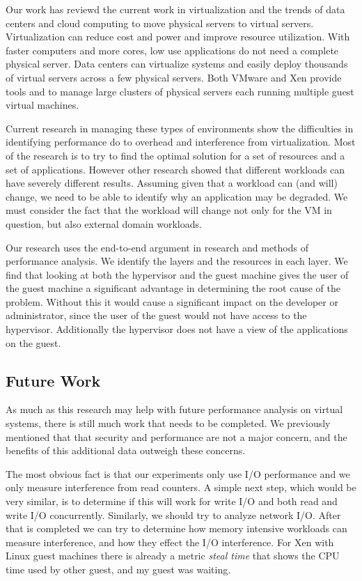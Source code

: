 
Our work has reviewd the current work in virtualization and the trends of data centers and cloud computing to move physical servers to virtual servers.  Virtualization can reduce cost and power and improve resource utilization.  With faster computers and more cores, low use applications do not need a complete physical server.  Data centers can virtualize systems and easily deploy thousands of virtual servers across a few physical servers.  Both VMware and Xen provide tools and to manage large clusters of physical servers each running multiple guest virtual machines.

Current research in managing these types of environments show the difficulties in identifying performance do to overhead and interference from virtualization.  Most of the research is to try to find the optimal solution for a set of resources and a set of applications.  However other research showed that different workloads can have severely different results.  Assuming given that a workload can (and will) change, we need to be able to identify why an application may be degraded.  We must consider the fact that the workload will change not only for the VM in question, but also external domain workloads. 

Our research uses the end-to-end argument in research and methods of performance analysis.  We identify the layers and the resources in each layer.  We find that looking at both the hypervisor and the guest machine gives the user of the guest machine a significant advantage in determining the root cause of the problem.  Without this it would cause a significant impact on the developer or administrator, since the user of the guest would not have access to the hypervisor.  Additionally the hypervisor does not have a view of the applications on the guest.  


\subsection{Future Work}
As much as this research may help with future performance analysis on virtual systems, there is still much work that needs to be completed.  We previously mentioned that that security and performance are not a major concern, and the benefits of this additional data outweigh these concerns.

The most obvious fact is that our experiments only use I/O performance and we only measure interference from read counters.  A simple next step, which would be very similar, is to determine if this will work for write I/O and both read and write I/O concurrently. Similarly, we should try to analyze network I/O. After that is completed we can try to determine how memory intensive workloads can measure interference, and how they effect the I/O interference.  For Xen with Linux guest machines there is already a metric \emph{steal time} that shows the CPU time used by other guest, and my guest was waiting.

